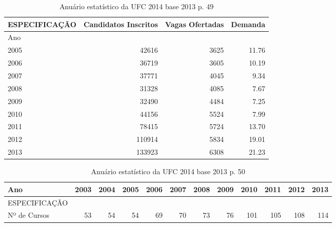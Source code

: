 \documentclass{report}
\begin{document}
\begin{table}
\begin{tabular}{lrrr}
\toprule
ESPECIFICAÇÃO &  Candidatos Inscritos &  Vagas Ofertadas &  Demanda \\
\midrule
Ano  &                       &                  &          \\
2005 &  42616 &  3625 &  11.76 \\
2006 &  36719 &  3605 &  10.19 \\
2007 &  37771 &  4045 &  9.34 \\
2008 &  31328 &  4085 &  7.67 \\
2009 &  32490 &  4484 &  7.25 \\
2010 &  44156 &  5524 &  7.99 \\
2011 &  78415 &  5724 &  13.70 \\
2012 &  110914 &  5834 &  19.01 \\
2013 &  133923 &  6308 &  21.23 \\
\bottomrule
\end{tabular}
\caption{Anuário estatístico da UFC 2014 base 2013 p. 49}
\label{table:inscritos-ufc}
\end{table}

\begin{table}
\begin{tabular}{lrrrrrrrrrrr}
\toprule
Ano &  2003 &  2004 &  2005 &  2006 &  2007 &  2008 &  2009 &  2010 &  2011 &  2012 &  2013 \\
\midrule
ESPECIFICAÇÃO &       &       &       &       &       &       &       &       &       &       &       \\
Nº de Cursos  &  53 &  54 &  54 &  69 &  70 &  73 &  76 &  101 &  105 &  108 &  114 \\
\bottomrule
\end{tabular}
\caption{Anuário estatístico da UFC 2014 base 2013 p. 50}
\label{table:numero_cursos-ufc}
\end{table}
\end{document}
